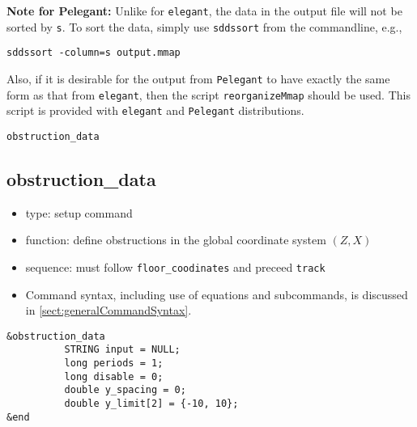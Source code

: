 \documentclass[11pt]{article}
\begin{document}
{\bf Note for Pelegant:} Unlike for {\tt elegant}, the data in the output file will not be sorted by \verb|s|.
To sort the data, simply use \verb|sddssort| from the commandline, e.g.,
\begin{verbatim}
sddssort -column=s output.mmap
\end{verbatim}
Also, if it is desirable for the output from \verb|Pelegant| to have exactly the same form as that from 
\verb|elegant|, then the script \verb|reorganizeMmap| should be used. This script is provided with 
\verb|elegant| and \verb|Pelegant| distributions.

\newpage
\begin{center}{\Large\verb|obstruction_data|}\end{center}
\subsection{obstruction\_data \label{subsec:obstructiondata}}

\begin{itemize}
\item type: setup command
\item function: define obstructions in the global coordinate system $(Z, X)$
\item sequence: must follow \verb|floor_coodinates| and preceed \verb|track|
\item Command syntax, including use of equations and subcommands, is discussed in \ref{sect:generalCommandSyntax}.
\end{itemize}

\begin{verbatim}
&obstruction_data
          STRING input = NULL;
          long periods = 1;
          long disable = 0;
          double y_spacing = 0;
          double y_limit[2] = {-10, 10};
&end
\end{verbatim}
\end{document}
